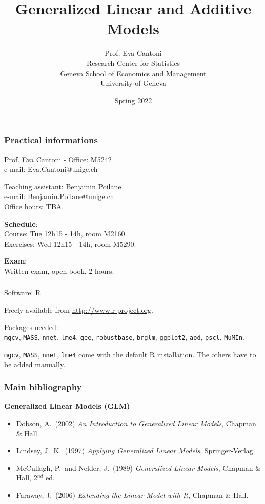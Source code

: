 \documentclass{beamer}
\title{Generalized Linear and Additive Models}
\author{Prof. Eva Cantoni \\
    Research Center for Statistics \\
    Geneva School of Economics and Management \\
    University of Geneva 
}
\date{Spring 2022}
\newcommand{\bs}{\bigskip}
\begin{document}
\begin{frame}
\titlepage
\end{frame}

\begin{frame}
\frametitle{Practical informations}

Prof. Eva Cantoni - Office: M5242\\
e-mail: Eva.Cantoni@unige.ch \\

\medskip

Teaching assistant: Benjamin Poilane\\
e-mail: Benjamin.Poilane@unige.ch\\

Office hours: TBA.\\

\bigskip

\textbf{Schedule}:   \\
Course: Tue 12h15 - 14h, room M2160 \\
Exercises: Wed 12h15 - 14h, room M5290.

\bigskip

\textbf{Exam}:   \\
Written exam, open book, 2 hours.


\end{frame}

\begin{frame}
\frametitle{}

Software: R

\bs

Freely available from 
\url{http://www.r-project.org}.

\bs
Packages needed:\\
\texttt{mgcv}, \texttt{MASS}, \texttt{nnet}, \texttt{lme4}, \texttt{gee}, \texttt{robustbase}, \texttt{brglm}, \texttt{ggplot2}, 
\texttt{aod}, \texttt{pscl}, \texttt{MuMIn}.
\bs

\texttt{mgcv}, \texttt{MASS}, \texttt{nnet}, \texttt{lme4} come with the default R
installation. The others have to be added manually.

\end{frame}


\begin{frame}
\frametitle{Main bibliography}

\textbf{Generalized Linear Models (GLM)}
\begin{itemize}
\item Dobson, A.\ (2002) \textit{An Introduction to Generalized Linear Models}, Chapman \& Hall.
\item Lindsey, J.\ K.\ (1997) \textit{Applying Generalized Linear Models}, Springer-Verlag.
\item McCullagh, P.\ and Nelder, J.\ (1989) \textit{Generalized Linear Models},
Chapman \& Hall, 2$^{nd}$ ed.
\item Faraway, J.\ (2006) \textit{Extending the Linear Model with R}, Chapman \& Hall.
\end{itemize}
\end{frame}
\end{document}
